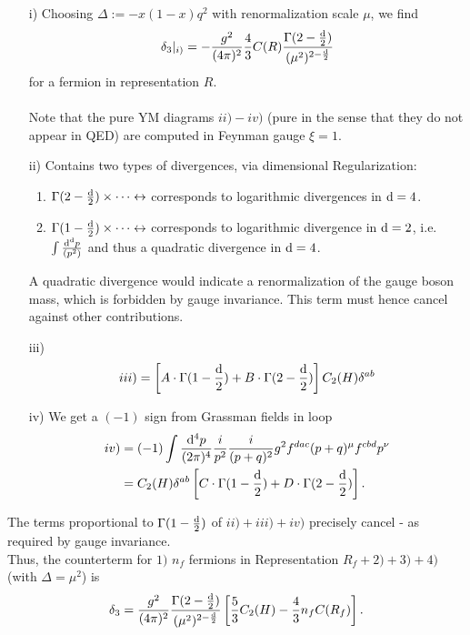 \begin{enumerate}
	\item[i)] Choosing $\Delta:= -x(1-x)q^2$ with renormalization scale $\mu$, we find
	\begin{equation}
		\delta_3 |_{i)} = -\frac{g^2}{(4 \pi)^2} \frac{4}{3} C(R) \frac{\Gamma(2-\frac{\mathrm{d}}{2})}{(\mu^2)^{2-\frac{\mathrm{d}}{2}}}
	\end{equation}
	for a fermion in representation $R$.\\
	\\
	Note that the pure YM diagrams $ii)-iv)$ (pure in the sense that they do not appear in QED) are computed in Feynman gauge $\xi=1$.
	\item[ii)] Contains two types of divergences, via dimensional Regularization:
	\begin{enumerate}
		\item $\Gamma(2-\frac{\mathrm{d}}{2})\times \dots \leftrightarrow$ corresponds to logarithmic divergences in $\mathrm{d}=4$.
		\item $\Gamma(1-\frac{\mathrm{d}}{2})\times \dots \leftrightarrow$ corresponds to logarithmic divergence in $\mathrm{d}=2$, i.e. $\int \frac{\mathrm{d}^{\mathrm{d}} p}{(p^2)}$ and thus a quadratic divergence in $\mathrm{d}=4$.
	\end{enumerate}
A quadratic divergence would indicate a renormalization of the gauge boson mass, which is forbidden by gauge invariance. This term must hence cancel against other contributions.
\item[iii)]
\begin{equation}
	iii)= \left[A \cdot \Gamma(1-\frac{\mathrm{d}}{2}) + B\cdot \Gamma(2-\frac{\mathrm{d}}{2}) \right] C_2(H) \delta^{ab} 
\end{equation}
\item[iv)]
We get a $(-1)$ sign from Grassman fields in loop
\begin{align}
	iv)&= (-1) \int \frac{\mathrm{d}^4p}{(2 \pi)^4} \frac{i}{p^2} \frac{i}{(p+q)^2} g^2 f^{dac} (p+q)^\mu f^{cbd} p^\nu \nonumber \\
	&= C_2(H) \delta^{ab} \left[C \cdot \Gamma(1-\frac{\mathrm{d}}{2}) + D\cdot \Gamma(2-\frac{\mathrm{d}}{2})\right].
\end{align}
\end{enumerate}
The terms proportional to $\Gamma(1-\frac{\mathrm{d}}{2})$ of $ii)+iii)+iv)$ precisely cancel - as required by gauge invariance.
\\
Thus, the counterterm for $1)$ $n_f$ fermions in Representation $R_f+2)+3)+4)$ (with $\Delta= \mu^2$) is
\begin{equation}
	\delta_3 = \frac{g^2}{(4 \pi)^2} \frac{\Gamma(2-\frac{\mathrm{d}}{2})}{(\mu^2)^{2-\frac{\mathrm{d}}{2}}} \left[\frac{5}{3} C_2(H) - \frac{4}{3} n_f C(R_f)\right].
\end{equation}



